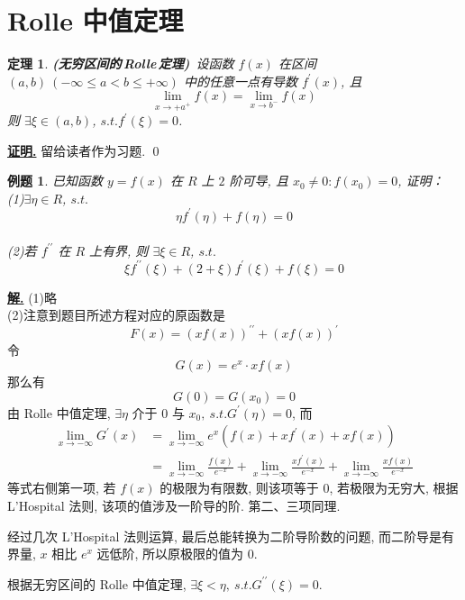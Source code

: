 \documentclass[10pt,a4paper]{book}
\theoremstyle{thmstyle} %
\newtheorem{theorem}{定理}[chapter]
\theoremstyle{defstyle} %
\theoremstyle{prostyle} %
\newtheorem{example}{例题}[chapter]
\renewenvironment{proof}[1][证明]{\par{\kaishu \uline{\textbf{#1.}}} \;\fangsong}{\qed\par}
\newenvironment{solution}{\par\underline{\textbf{解.}} \;\kaishu}{\par}
\begin{document}
	\section{ Rolle 中值定理}
	\begin{theorem}
		\textbf{(无穷区间的\,Rolle\,定理)}\ 设函数 $f(x)$ 在区间 $(a,b)\ (-\infty\leqslant\!a\!<\!b\!\leqslant+\infty)$ 中的任意一点有导数 $f^\prime (x)$, 且$$\lim\limits_{x\rightarrow +a^+}f(x)=\lim\limits_{x\rightarrow b^-}f(x)$$则 $\exists \xi\in (a,b)$, $s.t.f^\prime(\xi)=0$.
	\end{theorem}
	\begin{proof}
		留给读者作为习题.
	\end{proof}
	\begin{example}
		已知函数 $y=f(x)$ 在 $R$ 上 $2$ 阶可导, 且 $x_0\ne0:f(x_0)=0$, 证明：\\
		(1)$\exists\eta\in R$, $s.t.$
		$$
		\eta f^\prime(\eta)+f(\eta)=0
		$$
		\\
		(2)若 $f^{\prime\prime}$ 在 $R$ 上有界, 则 $\exists\xi\in R$, $s.t.$
		$$
		\xi f^{\prime\prime}(\xi)+(2+\xi)f^\prime(\xi)+f(\xi)=0
		$$
	\end{example}
	\begin{solution}
		(1)略\\
		(2)注意到题目所述方程对应的原函数是
		$$
		F\left( x \right) ={\left( xf\left( x \right) \right) ^{\prime\prime}}+\left( xf\left( x \right) \right) ^{\prime}
		$$
		令
		$$
		G\left( x \right) =e^x\cdot xf\left( x \right) 
		$$
		那么有
		$$
		G\left( 0 \right) =G\left( x_0 \right) =0
		$$
		由 Rolle 中值定理, $\exists\eta\text{ 介于 }0\text{ 与 }x_0,\ s.t.G^\prime(\eta)=0$, 而
		\begin{align*}
			\lim\limits_{x\rightarrow-\infty}G^\prime(x)&=	\lim\limits_{x\rightarrow-\infty}e^x(f(x)+xf^\prime(x)+xf(x))\\
			&=\lim\limits_{x\rightarrow-\infty}\frac{f(x)}{e^{-x}}+\lim\limits_{x\rightarrow-\infty}\frac{xf^\prime(x)}{e^{-x}}+\lim\limits_{x\rightarrow-\infty}\frac{xf(x)}{e^{-x}}
		\end{align*}
		\quad\quad 等式右侧第一项, 若 $f(x)$ 的极限为有限数, 则该项等于 $0$, 若极限为无穷大, 根据 L'Hospital 法则, 该项的值涉及一阶导的阶. 第二、三项同理.
		
		\quad\quad 经过几次 L'Hospital 法则运算, 最后总能转换为二阶导阶数的问题, 而二阶导是有界量, $x$ 相比 $e^x$ 远低阶, 所以原极限的值为 $0$.
		
		\quad\quad 根据无穷区间的 Rolle 中值定理, $\exists\xi<\eta,\ s.t.G^{\prime\prime}(\xi)=0$.
	\end{solution}
\end{document}
